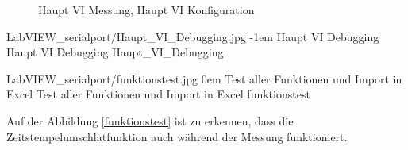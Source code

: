    \newpage
\begin{figure}[!h] %
	\centering
    \hspace{1mm}
\caption[Haupt VI Messung, Haupt VI Konfiguration]{Haupt VI Messung, Haupt VI Konfiguration}
\label{haupt_vi_messung_konfiguration}
   \end{figure}
   
{LabVIEW_serialport/Haupt_VI_Debugging.jpg}
{-1em}
{Haupt VI Debugging}
{Haupt VI Debugging}
{Haupt_VI_Debugging}



{LabVIEW_serialport/funktionstest.jpg}
{0em}
{Test aller Funktionen und Import in Excel}
{Test aller Funktionen und Import in Excel}
{funktionstest}

Auf der Abbildung \ref{funktionstest} ist zu erkennen, dass die Zeitstempelumschlatfunktion auch während der Messung funktioniert.


